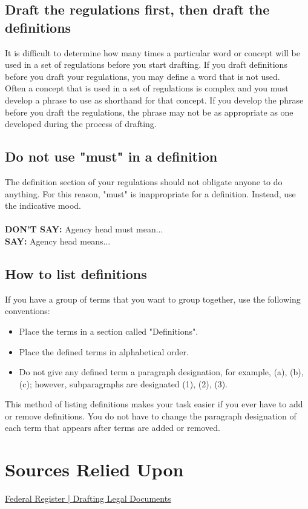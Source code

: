 \documentclass[12pt, letterpaper]{report}
\begin{document}
\begin{linenumbers}
\section{Draft the regulations first, then draft the definitions}
It is difficult to determine how many times a particular word or concept will be used in a set of regulations before you start drafting. If you draft definitions before you draft your regulations, you may define a word that is not used.\\
Often a concept that is used in a set of regulations is complex and you must develop a phrase to use as shorthand for that concept. If you develop the phrase before you draft the regulations, the phrase may not be as appropriate as one developed during the process of drafting.
\section{Do not use "must" in a definition} 
The definition section of your regulations should not obligate anyone to do anything. For this reason, "must" is inappropriate for a definition. Instead, use the indicative mood.\\\\
\textbf{DON'T SAY: }Agency head must mean...\\\textbf{
SAY: }Agency head means...
\section{How to list definitions} 
If you have a group of terms that you want to group together, use the following conventions:
\begin{itemize}
    \item Place the terms in a section called "Definitions".
    \item Place the defined terms in alphabetical order.
    \item Do not give any defined term a paragraph designation, for example, (a), (b), (c); however, subparagraphs are designated (1), (2), (3).
\end{itemize}
    This method of listing definitions makes your task easier if you ever have to add or remove definitions. You do not have to change the paragraph designation of each term that appears after terms are added or removed. 
	\end{linenumbers}
\chapter{Sources Relied Upon}
	\hyperlink{https://www.archives.gov/federal-register/write/legal-docs}{Federal Register | Drafting Legal Documents}\\
	
\end{document}
